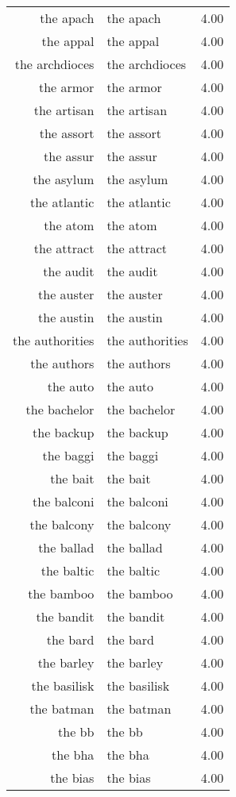 \begin{table}[ht]
\begin{tabular}{rlr}
  the apach & the apach & 4.00 \\ 
  the appal & the appal & 4.00 \\ 
  the archdioces & the archdioces & 4.00 \\ 
  the armor & the armor & 4.00 \\ 
  the artisan & the artisan & 4.00 \\ 
  the assort & the assort & 4.00 \\ 
  the assur & the assur & 4.00 \\ 
  the asylum & the asylum & 4.00 \\ 
  the atlantic & the atlantic & 4.00 \\ 
  the atom & the atom & 4.00 \\ 
  the attract & the attract & 4.00 \\ 
  the audit & the audit & 4.00 \\ 
  the auster & the auster & 4.00 \\ 
  the austin & the austin & 4.00 \\ 
  the authorities & the authorities & 4.00 \\ 
  the authors & the authors & 4.00 \\ 
  the auto & the auto & 4.00 \\ 
  the bachelor & the bachelor & 4.00 \\ 
  the backup & the backup & 4.00 \\ 
  the baggi & the baggi & 4.00 \\ 
  the bait & the bait & 4.00 \\ 
  the balconi & the balconi & 4.00 \\ 
  the balcony & the balcony & 4.00 \\ 
  the ballad & the ballad & 4.00 \\ 
  the baltic & the baltic & 4.00 \\ 
  the bamboo & the bamboo & 4.00 \\ 
  the bandit & the bandit & 4.00 \\ 
  the bard & the bard & 4.00 \\ 
  the barley & the barley & 4.00 \\ 
  the basilisk & the basilisk & 4.00 \\ 
  the batman & the batman & 4.00 \\ 
  the bb & the bb & 4.00 \\ 
  the bha & the bha & 4.00 \\ 
  the bias & the bias & 4.00 \\ 

\end{tabular}
\end{table}
